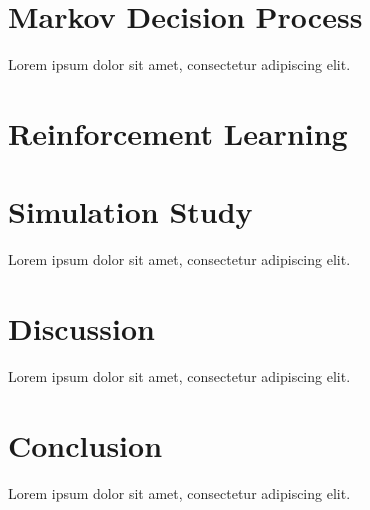 \documentclass[final,5p,times,twocolumn]{elsarticle}
\begin{document}
\section{Markov Decision Process}
\label{sec:mdp}

Lorem ipsum dolor sit amet, consectetur adipiscing elit.

\section{Reinforcement Learning}
\label{sec:rl}

\section{Simulation Study}
\label{sec:sim}

Lorem ipsum dolor sit amet, consectetur adipiscing elit.

\section{Discussion}
\label{sec:disc}

Lorem ipsum dolor sit amet, consectetur adipiscing elit.

\section{Conclusion}
\label{sec:concl}

Lorem ipsum dolor sit amet, consectetur adipiscing elit.

 

\end{document}
